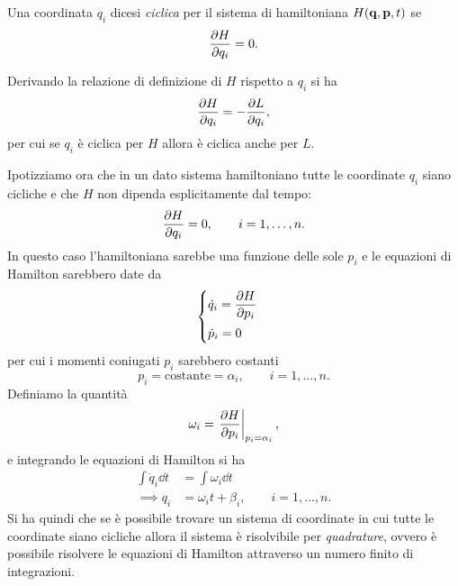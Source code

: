 \begin{definition}
    Una coordinata $q_i$ dicesi \emph{ciclica} per il sistema di hamiltoniana $H(\vb{q}, \vb{p}, t)$ se 
    \begin{equation*}
        \pdv{H}{q_i} = 0.
    \end{equation*}
\end{definition}
Derivando la relazione di definizione di $H$ rispetto a $q_i$ si ha
\begin{equation*}
    \pdv{H}{q_i} = - \pdv{L}{q_i},
\end{equation*}
per cui se $q_i$ è ciclica per $H$ allora è ciclica anche per $L$.

Ipotizziamo ora che in un dato sistema hamiltoniano tutte le coordinate $q_i$ siano cicliche e che $H$ non dipenda esplicitamente dal tempo:
\begin{equation*}
    \pdv{H}{q_i} = 0, \qquad i = 1, \dots, n.
\end{equation*}
In questo caso l'hamiltoniana sarebbe una funzione delle sole $p_i$ e le equazioni di Hamilton sarebbero date da
\begin{equation*}
    \begin{cases}
        \displaystyle \dot{q}_i = \pdv{H}{p_i} \\[0.3cm]
        \displaystyle \dot{p}_i = 0
    \end{cases}
\end{equation*}
per cui i momenti coniugati $p_i$ sarebbero costanti 
\begin{equation*}
    p_i = \text{costante} = \alpha_i, \qquad i = 1, \dots, n.
\end{equation*}
Definiamo la quantità
\begin{equation*}
    \omega_i = \left. \pdv{H}{p_i} \right|_{p_i = \alpha_i},
\end{equation*}
e integrando le equazioni di Hamilton si ha
\begin{align*}
    \int \dot{q}_i \dd{t} &= \int \omega_i \dd{t} \\
    \implies q_i &= \omega_i t + \beta_i, \qquad i = 1, \dots, n.
\end{align*}
Si ha quindi che se è possibile trovare un sistema di coordinate in cui tutte le coordinate siano cicliche allora il sistema è risolvibile per \emph{quadrature}, ovvero è possibile risolvere le equazioni di Hamilton attraverso un numero finito di integrazioni.

